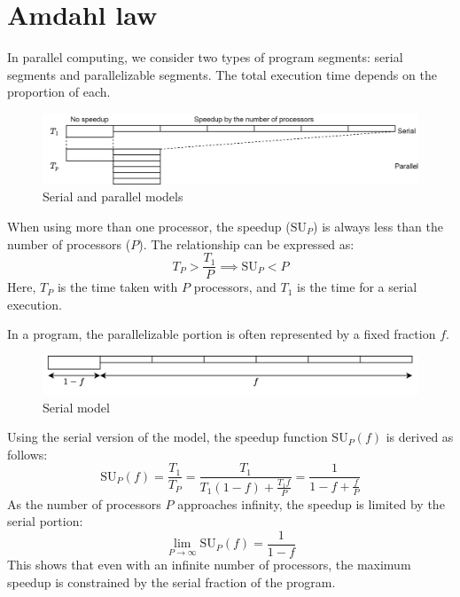 \section{Amdahl law}

In parallel computing, we consider two types of program segments: serial segments and parallelizable segments. 
The total execution time depends on the proportion of each.
\begin{figure}[H]
    \centering
    \includegraphics[width=0.8\linewidth]{images/am.png}
    \caption{Serial and parallel models}
\end{figure}
When using more than one processor, the speedup ($\text{SU}_P$) is always less than the number of processors ($P$). 
The relationship can be expressed as:
\[T_P>\dfrac{T_1}{P}\implies \text{SU}_P<P\]
Here, $T_P$ is the time taken with $P$ processors, and $T_1$ is the time for a serial execution.

In a program, the parallelizable portion is often represented by a fixed fraction $f$. 
\begin{figure}[H]
    \centering
    \includegraphics[width=0.8\linewidth]{images/am1.png}
    \caption{Serial model}
\end{figure}
Using the serial version of the model, the speedup function $\text{SU}_P(f)$ is derived as follows:
\[\text{SU}_P(f)=\dfrac{T_1}{T_P}=\dfrac{T_1}{T_1(1-f)+\frac{T_1f}{P}}=\dfrac{1}{1-f+\frac{f}{P}}\]
As the number of processors $P$ approaches infinity, the speedup is limited by the serial portion:
\[\lim_{P\rightarrow\infty}\text{SU}_P(f)=\dfrac{1}{1-f}\]
This shows that even with an infinite number of processors, the maximum speedup is constrained by the serial fraction of the program. 

